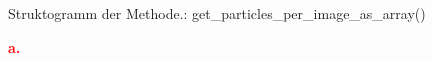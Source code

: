 \newpage

\begin{figure}[H]
  \centering
  \caption{Struktogramm der Methode.: get\_particles\_per\_image\_as\_array()}
  \label{fig:kap3_strukto_part_per_array}
\end{figure}

\begin{figure}[H]
  \centering
  \begin{center}
  	\textcolor{red}{\textbf{{\large a.}}}
  \end{center}
  \label{fig:kap3_strukto_part_per_array_t1}
\end{figure}

